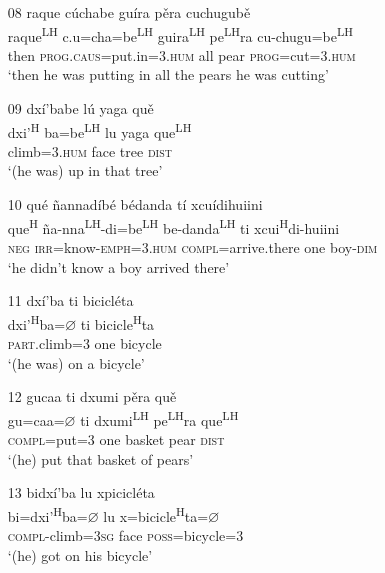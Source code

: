 \begin{itemize}
\item[08]
\glll raque c\'{u}chabe gu\'{i}ra p\v{e}ra cuchugub\v{e}\\
raque\textsuperscript{LH} c.u=cha=be\textsuperscript{LH}  guira\textsuperscript{LH} pe\textsuperscript{LH}ra cu-chugu=be\textsuperscript{LH}\\
then \textsc{prog}.\textsc{caus}=put.in=\textsc{3.hum} all pear \textsc{prog}=cut=\textsc{3.hum}\\
\glt `then he was putting in all the pears he was cutting'


\item[09]
\glll dx\'{i}'babe l\'{u} yaga qu\v{e}\\
dxi'\textsuperscript{H} ba=be\textsuperscript{LH}  lu yaga que\textsuperscript{LH}\\
climb=\textsc{3.hum} face tree \textsc{dist}\\
\glt `(he was) up in that tree'


\item[10]
\glll qu\'{e} \~{n}annad\'{i}b\'{e} b\'{e}danda t\'{i} xcu\'{i}dihuiini\\
que\textsuperscript{H} \~{n}a-nna\textsuperscript{LH}-di=be\textsuperscript{LH}  be-danda\textsuperscript{LH} ti xcui\textsuperscript{H}di-huiini\\
\textsc{neg} \textsc{irr}=know-\textsc{emph}=\textsc{3.hum} \textsc{compl}=arrive.there one boy-\textsc{dim}\\
\glt `he didn't know a boy arrived there'
 

\item[11]
\glll dx\'{i}'ba ti bicicl\'{e}ta\\
dxi'\textsuperscript{H}ba={$\varnothing$} ti bicicle\textsuperscript{H}ta\\
\textsc{part}.climb=\textsc{3} one bicycle\\
\glt `(he was) on a bicycle'


\item[12]
\glll gucaa ti dxumi p\v{e}ra qu\v{e}\\
gu=caa={$\varnothing$} ti dxumi\textsuperscript{LH} pe\textsuperscript{LH}ra que\textsuperscript{LH}\\
\textsc{compl}=put=\textsc{3} one basket pear \textsc{dist}\\
\glt `(he) put that basket of pears'


\item[13]
\glll bidx\'{i}'ba lu xpicicl\'{e}ta\\
bi=dxi'\textsuperscript{H}ba={$\varnothing$} lu x=bicicle\textsuperscript{H}ta={$\varnothing$}\\
\textsc{compl}-climb=3\textsc{sg} face \textsc{poss}=bicycle=\textsc{3}\\
\glt `(he) got on his bicycle'


\end{itemize}
